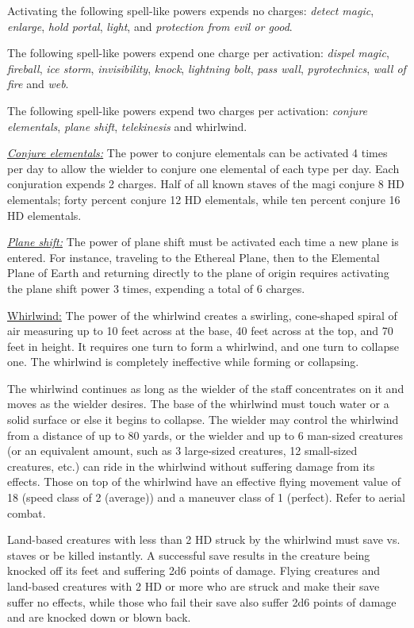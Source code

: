 \begin{multicols}{2}
Activating the following spell-like powers expends no charges: \textit{detect magic}, \textit{enlarge}, \textit{hold portal}, \textit{light}, and \textit{protection from evil or good}.

The following spell-like powers expend one charge per activation: \textit{dispel magic}, \textit{fireball}, \textit{ice storm}, \textit{invisibility}, \textit{knock}, \textit{lightning bolt}, \textit{pass wall}, \textit{pyrotechnics}, \textit{wall of fire} and \textit{web}.

The following spell-like powers expend two charges per activation: \textit{conjure elementals}, \textit{plane shift}, \textit{telekinesis} and whirlwind.

\underline{\textit{Conjure elementals:}} The power to conjure elementals can be activated 4 times per day to allow the wielder to conjure one elemental of each type per day.  Each conjuration expends 2 charges.  Half of all known staves of the magi conjure 8 HD elementals; forty percent conjure 12 HD elementals, while ten percent conjure 16 HD elementals.

\underline{\textit{Plane shift:}} The power of plane shift must be activated each time a new plane is entered.  For instance, traveling to the Ethereal Plane, then to the Elemental Plane of Earth and returning directly to the plane of origin requires activating the plane shift power 3 times, expending a total of 6 charges.

\underline{Whirlwind:} The power of the whirlwind creates a swirling, cone-shaped spiral of air measuring up to 10 feet across at the base, 40 feet across at the top, and 70 feet in height.  It requires one turn to form a whirlwind, and one turn to collapse one.  The whirlwind is completely ineffective while forming or collapsing.  

The whirlwind continues as long as the wielder of the staff concentrates on it and moves as the wielder desires.  The base of the whirlwind must touch water or a solid surface or else it begins to collapse.  The wielder may control the whirlwind from a distance of up to 80 yards, or the wielder and up to 6 man-sized creatures (or an equivalent amount, such as 3 large-sized creatures, 12 small-sized creatures, etc.) can ride in the whirlwind without suffering damage from its effects.  Those on top of the whirlwind have an effective flying movement value of 18 (speed class of 2 (average)) and a maneuver class of 1 (perfect).  Refer to aerial combat.

Land-based creatures with less than 2 HD struck by the whirlwind must save vs. staves or be killed instantly.  A successful save results in the creature being knocked off its feet and suffering 2d6 points of damage.  Flying creatures and land-based creatures with 2 HD or more who are struck and make their save suffer no effects, while those who fail their save also suffer 2d6 points of damage and are knocked down or blown back.


\end{multicols}
